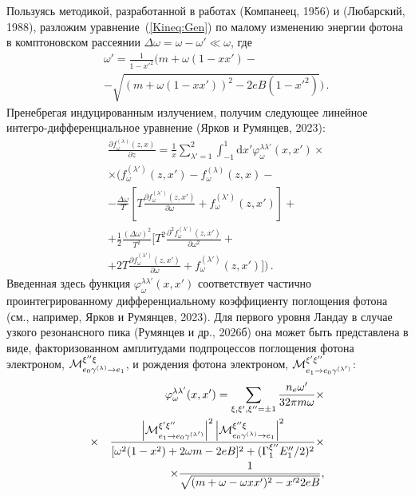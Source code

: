 \documentclass{pazh2col-win}
\newcommand{\dd}{\mathrm{d}} %
\begin{document}
Пользуясь методикой, разработанной в работах (Компанеец, 1956) и (Любарский, 1988), разложим уравнение~(\ref{Kineq:Gen}) по малому изменению энергии фотона в комптоновском рассеянии \linebreak $\Delta\omega=\omega-\omega'\ll\omega$, где
%
\begin{eqnarray}
\nonumber
&&\omega' = \frac{1}{1-x'^2}\bigg(m+\omega(1-x x') -
\\
&&- \sqrt{(m+\omega(1-x x'))^2 - 2eB (1-x'^2)}\bigg)\, .
\end{eqnarray}
%
Пренебрегая индуцированным излучением, получим следующее линейное интегро-дифференциальное уравнение (Ярков и Румянцев, 2023):
%
\begin{eqnarray}
\label{eq:KinSerDeltaw}
\nonumber
&&\frac{\partial f^{(\lambda)}_\omega(z,x)}{\partial z} = \frac{1}{x} \sum_{\lambda'=1}^{2} \int_{-1}^{1}\dd x'\varphi_\omega^{\lambda\lambda'}(x,x') \times
\\
\nonumber
&&\times\bigg(f_\omega^{(\lambda')}(z,x')-f_\omega^{(\lambda)}(z,x)-
\\
\nonumber
&&- \frac{\Delta \omega}{T}\left[T \frac{\partial f_\omega^{(\lambda')}(z,x')}{\partial \omega} + f_\omega^{(\lambda')}(z,x')\right]+
\\
\nonumber
&&+ \frac{1}{2}\frac{(\Delta \omega)^2}{T^2}\bigg[T^2 \frac{\partial^2 f_\omega^{(\lambda')}(z,x')}{\partial \omega^2} + 
\\
&&+2T \frac{\partial f_\omega^{(\lambda')}(z,x')}{\partial \omega} +  f_\omega^{(\lambda')}(z,x')\bigg]\bigg)\, .
\end{eqnarray}
%
Введенная здесь функция $\varphi_\omega^{\lambda\lambda'}(x,x')$ соответствует частично проинтегрированному дифференциальному коэффициенту поглощения фотона (см., например, Ярков и Румянцев, 2023). Для первого уровня Ландау в случае узкого резонансного пика (Румянцев и др., 2026б) она может быть представлена в виде, факторизованном амплитудами подпроцессов поглощения фотона электроном, ${\cal M}^{\xi''\xi}_{e_0\gamma^{(\lambda)}\to e_1 }$, и рождения фотона электроном, ${\cal M}^{\xi'\xi''}_{e_1\to e_0\gamma^{(\lambda')}}$:
%
\begin{eqnarray}
\label{phi}
\nonumber
&&\varphi^{\lambda\lambda'}_\omega(x,x') =  \sum_{\xi,\xi',\xi''=\pm 1}
\frac{n_e \omega'}{32 \pi m \omega} \times
\\
\nonumber
\times
&&\frac{\left|{\cal M}^{\xi'\xi''}_{e_1\to e_0\gamma^{(\lambda')}}\right|^2
\left|{\cal M}^{\xi''\xi}_{e_0\gamma^{(\lambda)}\to e_1 }\right|^2}
{[\omega^2(1-x^2)+2\omega m - 2eB]^2 + (\Gamma_1^{\xi''}E_1''/2)^2} 
\times
\\
&&\times
\frac{1}{\sqrt{(m+\omega - \omega x x')^2 - x'^2 2eB}} ,
\end{eqnarray}
\end{document}
